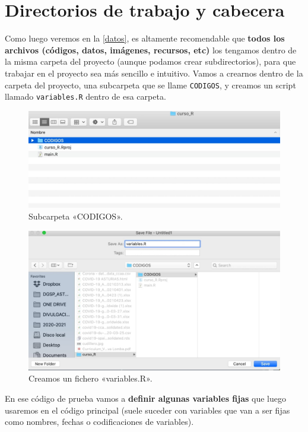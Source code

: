 \documentclass[11pt,]{book}
\begin{document}
\hypertarget{directorios-de-trabajo-y-cabecera}{%
\section{Directorios de trabajo y cabecera}\label{directorios-de-trabajo-y-cabecera}}

Como luego veremos en la \ref{datos}, es altamente recomendable que \textbf{todos los archivos (códigos, datos, imágenes, recursos, etc)} los tengamos dentro de la misma carpeta del proyecto (aunque podamos crear subdirectorios), para que trabajar en el proyecto sea más sencillo e intuitivo. Vamos a crearnos dentro de la carpeta del proyecto, una subcarpeta que se llame \texttt{CODIGOS}, y creamos un script llamado \texttt{variables.R} dentro de esa carpeta.

\begin{figure}

{\centering \includegraphics[width=0.5\linewidth]{./img/carpeta_codigos} 

}

\caption{Subcarpeta «CODIGOS».}\label{fig:carpeta-codigos}
\end{figure}

\begin{figure}

{\centering \includegraphics[width=0.5\linewidth]{./img/carpeta_codigos1} 

}

\caption{Creamos un fichero «variables.R».}\label{fig:carpeta-codigos1}
\end{figure}

En ese código de prueba vamos a \textbf{definir algunas variables fijas} que luego usaremos en el código principal (suele suceder con variables que van a ser fijas como nombres, fechas o codificaciones de variables).
\end{document}
